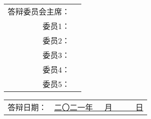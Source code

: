 \vskip 10pt

\begin{center}
    \begin{tabularx}{.68\textwidth}{>{\fangsong}r >{\fangsong}X<{\centering}}
        答辩委员会主席： & \uline{\hfill} \\
        委员1： &  \uline{\hfill} \\
        委员2： &  \uline{\hfill} \\
        委员3： &  \uline{\hfill} \\
        委员4： &  \uline{\hfill} \\
        委员5： &  \uline{\hfill} \\
    \end{tabularx}
\end{center}

\vskip 10pt

\begin{center}
    \begin{tabularx}{.5\textwidth}{>{\fangsong}l >{\fangsong}X<{\centering}}
        答辩日期： & \uline{\hfill 二〇二一年~~~月~~~~~~日 \hfill}
    \end{tabularx}
\end{center}
